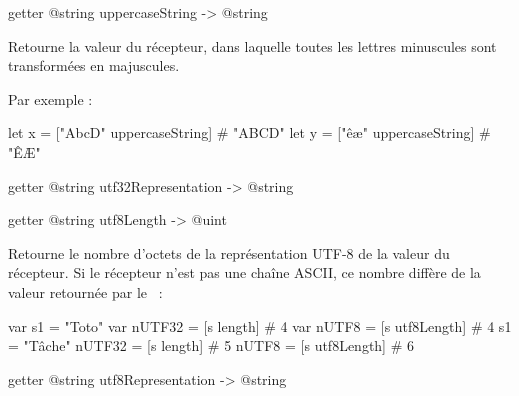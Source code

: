 \begin{galgasbox}
getter @string uppercaseString -> @string
\end{galgasbox}

Retourne la valeur du récepteur, dans laquelle toutes les lettres minuscules sont transformées en majuscules.

Par exemple :
\begin{galgas}
let x = ["AbcD" uppercaseString] # "ABCD"
let y = ["êæ" uppercaseString] # "ÊÆ"
\end{galgas}















\begin{galgasbox}
getter @string utf32Representation -> @string
\end{galgasbox}
















\begin{galgasbox}
getter @string utf8Length -> @uint
\end{galgasbox}

Retourne le nombre d'octets de la représentation UTF-8 de la valeur du récepteur. Si le récepteur n'est pas une chaîne ASCII, ce nombre diffère de la valeur retournée par le ~:

\begin{galgas}
 var s1 = "Toto"
 var nUTF32 = [s length] # 4
 var nUTF8  = [s utf8Length] # 4
 s1 = "Tâche"
 nUTF32 = [s length] # 5
 nUTF8  = [s utf8Length] # 6
\end{galgas}









\begin{galgasbox}
getter @string utf8Representation -> @string
\end{galgasbox}

